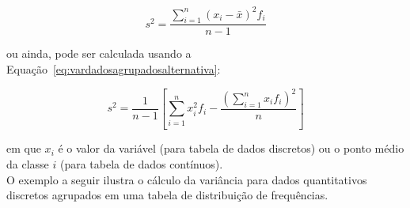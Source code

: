 \documentclass[11pt,fleqn]{book} %
\begin{document}
\begin{eBox}
\vspace{-0.5cm}
\begin{equation} \label{eq:vardadosagrupados}
s^2=\frac{\displaystyle\sum_{i=1}^{n}(x_i-\bar{x})^2 f_i}{n-1} 
\end{equation}
\end{eBox}

\vspace{0,3cm}

\noindent ou ainda, pode ser calculada usando a Equação~\ref{eq:vardadosagrupadosalternativa}:

\vspace{0,3cm}

\begin{eBox}
\vspace{-0.5cm}
\begin{equation} \label{eq:vardadosagrupadosalternativa}
s^2=\frac{1}{n-1}\left[\displaystyle\sum_{i=1}^{n}{x_i^2 f_i}-\frac{\left(\displaystyle\sum_{i=1}^{n} x_i f_i \right)^2}{n}\right] 
\end{equation}
\end{eBox}

\vspace{0,3cm}

\noindent em que $x_i$ é o valor da variável (para tabela de dados discretos) ou o ponto médio da classe $i$ (para tabela de dados contínuos). \\

O exemplo a seguir ilustra o cálculo da variância para dados quantitativos discretos agrupados em uma tabela de distribuição de frequências. \\
\end{document}
